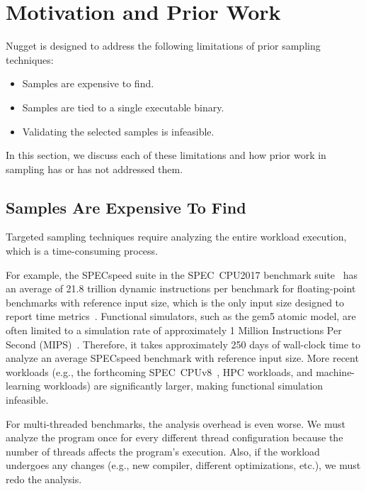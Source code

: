 \section{Motivation and Prior Work}\label{sec:motivation_and_prior_work}
Nugget is designed to address the following limitations of prior sampling techniques:

\begin{itemize}
    \item Samples are expensive to find.
    \item Samples are tied to a single executable binary.
    \item Validating the selected samples is infeasible.
\end{itemize}

In this section, we discuss each of these limitations and how prior work in sampling has or has not addressed them.

\subsection{Samples Are Expensive To Find}\label{sec:finding_samples_is_expensive}

Targeted sampling techniques require analyzing the entire workload execution, which is a time-consuming process.

For example, the SPECspeed suite in the SPEC~CPU2017 benchmark suite~\cite{spec2017} has an average of 21.8 trillion dynamic instructions per benchmark for floating-point benchmarks with reference input size, which is the only input size designed to report time metrics~\cite{spec2017-workload-characterization}.
Functional simulators, such as the gem5 atomic model, are often limited to a simulation rate of approximately 1 Million Instructions Per Second (MIPS)~\cite{sustainable_gem5_simulations}.
Therefore, it takes approximately 250 days of wall-clock time to analyze an average SPECspeed benchmark with reference input size.
More recent workloads (e.g., the forthcoming SPEC~CPUv8~\cite{spec2017v8}, HPC workloads, and machine-learning workloads) are significantly larger, making functional simulation infeasible.

For multi-threaded benchmarks, the analysis overhead is even worse.
We must analyze the program once for every different thread configuration because the number of threads affects the program's execution.
Also, if the workload undergoes any changes (e.g., new compiler, different optimizations, etc.), we must redo the analysis.

